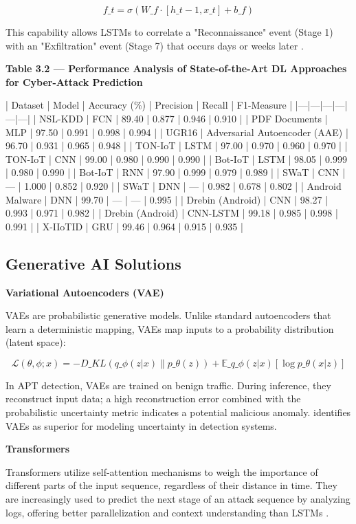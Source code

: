 \[f\_t = \sigma(W\_f \cdot [h\_{t-1}, x\_t] + b\_f)\]

This capability allows LSTMs to correlate a "Reconnaissance" event (Stage 1) with an "Exfiltration" event (Stage 7) that occurs days or weeks later \cite{ankalaki2025cyber}.

\textbf{Table 3.2 — Performance Analysis of State-of-the-Art DL Approaches for Cyber-Attack Prediction \cite{ankalaki2025cyber}}

| Dataset | Model | Accuracy (\%) | Precision | Recall | F1-Measure |
|---|---|---|---|---|---|
| NSL-KDD | FCN | 89.40 | 0.877 | 0.946 | 0.910 |
| PDF Documents | MLP | 97.50 | 0.991 | 0.998 | 0.994 |
| UGR16 | Adversarial Autoencoder (AAE) | 96.70 | 0.931 | 0.965 | 0.948 |
| TON-IoT | LSTM | 97.00 | 0.970 | 0.960 | 0.970 |
| TON-IoT | CNN | 99.00 | 0.980 | 0.990 | 0.990 |
| Bot-IoT | LSTM | 98.05 | 0.999 | 0.980 | 0.990 |
| Bot-IoT | RNN | 97.90 | 0.999 | 0.979 | 0.989 |
| SWaT | CNN | — | 1.000 | 0.852 | 0.920 |
| SWaT | DNN | — | 0.982 | 0.678 | 0.802 |
| Android Malware | DNN | 99.70 | — | — | 0.995 |
| Drebin (Android) | CNN | 98.27 | 0.993 | 0.971 | 0.982 |
| Drebin (Android) | CNN-LSTM | 99.18 | 0.985 | 0.998 | 0.991 |
| X-IIoTID | GRU | 99.46 | 0.964 | 0.915 | 0.935 |

\subsection{Generative AI Solutions}

\textbf{Variational Autoencoders (VAE)}

VAEs are probabilistic generative models. Unlike standard autoencoders that learn a deterministic mapping, VAEs map inputs to a probability distribution (latent space):

\[\mathcal{L}(\theta,\phi;x) = -D\_{KL}(q\_\phi(z|x) \| p\_\theta(z)) + \mathbb{E}\_{q\_\phi(z|x)}[\log p\_\theta(x|z)]\]

In APT detection, VAEs are trained on benign traffic. During inference, they reconstruct input data; a high reconstruction error combined with the probabilistic uncertainty metric indicates a potential malicious anomaly. \cite{ankalaki2025cyber} identifies VAEs as superior for modeling uncertainty in detection systems.

\textbf{Transformers}

Transformers utilize self-attention mechanisms to weigh the importance of different parts of the input sequence, regardless of their distance in time. They are increasingly used to predict the next stage of an attack sequence by analyzing logs, offering better parallelization and context understanding than LSTMs \cite{ankalaki2025cyber}.


